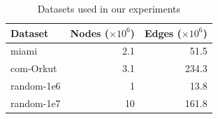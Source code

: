 \begin{table}[ht]
\centering \caption{\small Datasets used in our experiments}
\vspace{-.1in}
\label{table:datasets}
\begin{tabular}{|l|r|r|}
\hline
\textbf{Dataset}  & \textbf{Nodes ($\times 10^6$)} & \textbf{Edges ($\times 10^6$)} \\
\hline
miami & 2.1 & 51.5\\
\hline
com-Orkut  & 3.1 & 234.3\\
\hline
random-1e6 & 1 & 13.8\\
\hline
random-1e7 & 10 & 161.8\\
\hline
\end{tabular}
\end{table}

